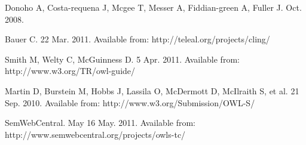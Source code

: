 \documentclass[9pt, twocolumn]{phdsymp} %
\begin{document}
%
\begin{thebibliography}{1}
%
Donoho A, Costa-requena J, Mcgee T, Messer A, Fiddian-green A, Fuller J.  Oct. 2008. 

Bauer C.  22 Mar. 2011. Available from: http://teleal.org/projects/cling/

Smith M, Welty C, McGuinness D.  5 Apr. 2011. Available from: http://www.w3.org/TR/owl-guide/

Martin D, Burstein M, Hobbs J, Lassila O, McDermott D, McIlraith S, et al.  21 Sep. 2010. Available from: http://www.w3.org/Submission/OWL-S/

SemWebCentral.  May 16 May. 2011. Available from: http://www.semwebcentral.org/projects/owls-tc/



%
%
\end{thebibliography}
%
\end{document}
